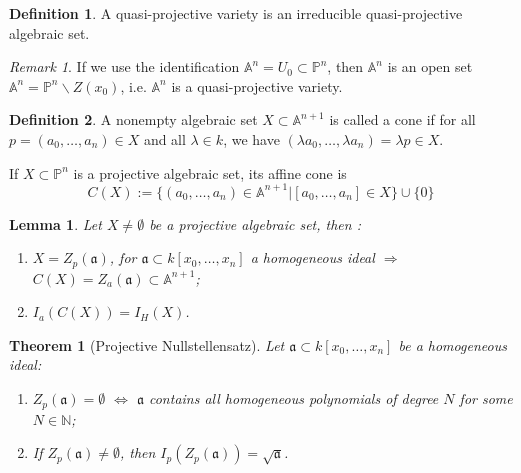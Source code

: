 \documentclass{amsart}
\theoremstyle{plain}
\newtheorem{theorem}{Theorem}
\newtheorem{lemma}{Lemma}
\theoremstyle{definition}
\newtheorem{definition}{Definition}
\theoremstyle{remark}
\newtheorem*{remark}{Remark}
\numberwithin{equation}{section}
\begin{document}
\begin{definition}
	A quasi-projective variety is an irreducible quasi-projective algebraic set.
\end{definition}
\begin{remark}
	If we use the identification $ \mathbb{A}^n=U_0\subset \mathbb{P}^n $, then $ \mathbb{A}^n $ is an open set $ \mathbb{A}^n=\mathbb{P}^n\backslash Z(x_0) $, i.e. $ \mathbb{A}^n $ is a quasi-projective variety.
\end{remark}
\begin{definition}
	A nonempty algebraic set $ X\subset \mathbb{A}^{n+1} $ is called a cone if for all $ p=(a_0,\dots,a_n)\in X $ and all $ \lambda \in k $, we have $ (\lambda a_0,\dots,\lambda a_n)=\lambda p\in X $.

	If $ X\subset \mathbb{P}^n $ is a projective algebraic set, its affine cone is
	\begin{equation}
	C(X):=\{ (a_0,\dots,a_n)\in \mathbb{A}^{n+1}|[a_0,\dots,a_n]\in X \}\cup\{ 0 \}
	\end{equation}
\end{definition}
\begin{lemma}
	Let $ X\neq\emptyset $ be a projective algebraic set, then :
	\begin{enumerate}
		\item $ X=Z_p(\mathfrak{a}) $, for $ \mathfrak{a}\subset k[x_0,\dots,x_n]$ a   homogeneous ideal $ \Rightarrow $ $ C(X)=Z_a(\mathfrak{a})\subset \mathbb{A}^{n+1} $;
		\item $ I_a(C(X))=I_H(X) $.
	\end{enumerate}
\end{lemma}
\begin{theorem}[Projective Nullstellensatz]
	Let $ \mathfrak{a}\subset k[x_0,\dots,x_n] $ be a homogeneous ideal:
	\begin{enumerate}
	\item $ Z_p(\mathfrak{a})=\emptyset $ $ \Leftrightarrow $ $ \mathfrak{a} $ contains all homogeneous polynomials of degree $ N $ for some $ N\in \mathbb{N} $;
	\item If $ Z_p(\mathfrak{a})\neq \emptyset $, then $ I_p(Z_p(\mathfrak{a}))=\sqrt{\mathfrak{a}} $.
	\end{enumerate}
\end{theorem}
\end{document}
